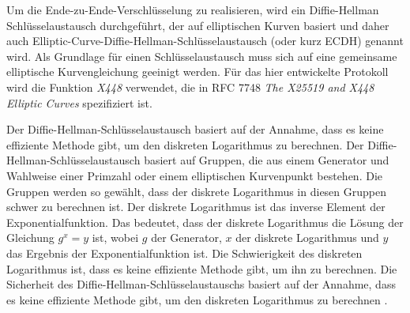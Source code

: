 Um die Ende-zu-Ende-Verschlüsselung zu realisieren, wird ein Diffie-Hellman Schlüsselaustausch durchgeführt, der auf elliptischen Kurven basiert und daher auch Elliptic-Curve-Diffie-Hellman-Schlüsselaustausch (oder kurz ECDH) genannt wird. Als Grundlage für einen Schlüsselaustausch muss sich auf eine gemeinsame elliptische Kurvengleichung geeinigt werden\Parencite[S. 118]{Wong_KryptoPraxis}. Für das hier entwickelte Protokoll wird die Funktion \textit{X448} verwendet, die in RFC 7748 \textit{The X25519 and X448 Elliptic Curves} \parencite{rfc_ellipticCurves} spezifiziert ist.

Der Diffie-Hellman-Schlüsselaustausch basiert auf der Annahme, dass es keine effiziente Methode gibt, um den diskreten Logarithmus zu berechnen. Der Diffie-Hellman-Schlüsselaustausch basiert auf Gruppen, die aus einem Generator und Wahlweise einer Primzahl oder einem elliptischen Kurvenpunkt bestehen. Die Gruppen werden so gewählt, dass der diskrete Logarithmus in diesen Gruppen schwer zu berechnen ist. Der diskrete Logarithmus ist das inverse Element der Exponentialfunktion. Das bedeutet, dass der diskrete Logarithmus die Lösung der Gleichung $g^x = y$ ist, wobei $g$ der Generator, $x$ der diskrete Logarithmus und $y$ das Ergebnis der Exponentialfunktion ist. Die Schwierigkeit des diskreten Logarithmus ist, dass es keine effiziente Methode gibt, um ihn zu berechnen. Die Sicherheit des Diffie-Hellman-Schlüsselaustauschs basiert auf der Annahme, dass es keine effiziente Methode gibt, um den diskreten Logarithmus zu berechnen \Parencite[S. 105-121]{Wong_KryptoPraxis}.


